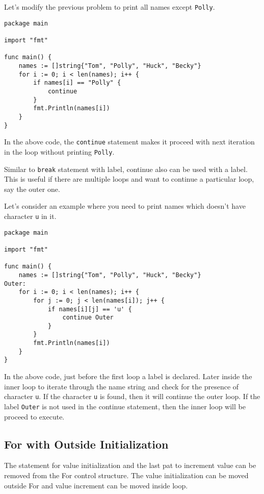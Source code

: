 Let's modify the previous problem to print all names
except \texttt{Polly}.

\begin{lstlisting}[caption=For loop with continue]
package main

import "fmt"

func main() {
    names := []string{"Tom", "Polly", "Huck", "Becky"}
    for i := 0; i < len(names); i++ {
        if names[i] == "Polly" {
            continue
        }
        fmt.Println(names[i])
    }
}
\end{lstlisting}

In the above code, the \texttt{continue} statement makes it proceed
with next iteration in the loop without printing \texttt{Polly}.

Similar to \texttt{break} statement with label, continue also can be
used with a label.  This is useful if there are
multiple loops and want to continue a particular loop, say the outer
one.

Let's consider an example where you need to print names which doesn't
have character \texttt{u} in it.

\begin{lstlisting}[caption=For loop with continue and label]
package main

import "fmt"

func main() {
    names := []string{"Tom", "Polly", "Huck", "Becky"}
Outer:
    for i := 0; i < len(names); i++ {
        for j := 0; j < len(names[i]); j++ {
            if names[i][j] == 'u' {
                continue Outer
            }
        }
        fmt.Println(names[i])
    }
}
\end{lstlisting}

In the above code, just before the first loop a label is declared.
Later inside the inner loop to iterate through the name string and
check for the presence of character \texttt{u}.  If the
character \texttt{u} is found, then it will continue the outer loop.
If the label \texttt{Outer} is not used in the continue statement,
then the inner loop will be proceed to execute.

\subsection{For with Outside Initialization}

The statement for value initialization and the last pat to increment
value can be removed from the For control structure.  The value
initialization can be moved outside For and value increment can be
moved inside loop.

